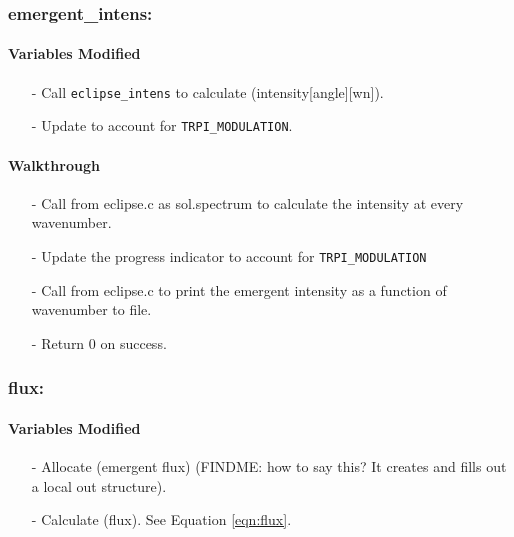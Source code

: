 \documentclass[letterpaper,12pt]{article}
\begin{document}
\subsubsection{emergent\_intens:}
\paragraph{Variables Modified}
\begin{enumerate}[leftmargin=10pt, noitemsep, parsep=0pt, topsep=0ex]
\item[-] Call {\tt eclipse\_intens} to calculate  (intensity[angle][wn]).
\item[-] Update  to account for {\tt TRPI\_MODULATION}.
\end{enumerate}

\noindent
\paragraph{Walkthrough}
\begin{enumerate}[leftmargin=10pt, noitemsep, parsep=0pt, topsep=0ex]
\item[-] Call  from eclipse.c as sol.spectrum to calculate the intensity at every wavenumber.
\item[-] Update the progress indicator to account for {\tt TRPI\_MODULATION}
\item[-] Call  from eclipse.c to print the emergent intensity as a function of wavenumber to file.
\item[-] Return 0 on success.
\end{enumerate}

\subsubsection{flux:}
\paragraph{Variables Modified}
\begin{enumerate}[leftmargin=10pt, noitemsep, parsep=0pt, topsep=0ex]
\item[-] Allocate  (emergent flux) (FINDME: how to say this? It creates and fills out a local out structure).
\item[-] Calculate  (flux). See Equation \ref{eqn:flux}.
\end{enumerate}
\end{document}
